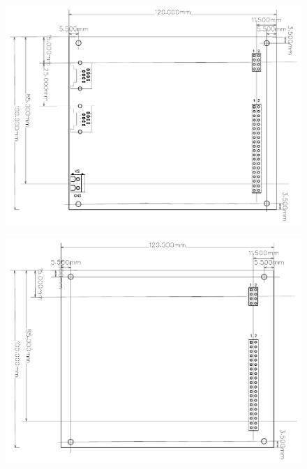 \begin{figure}[ht]
    \centering
    \includegraphics[page=1, width=\textwidth]{./Figures/LCS-FP-MAIN-CTRL-40-10X12.pdf}
\end{figure}

\FloatBarrier

\begin{figure}[ht]
    \centering
    \includegraphics[page=1, width=\textwidth]{./figures/LCS-FP-EXT-R-40-10X12.pdf}
\end{figure}

\FloatBarrier

